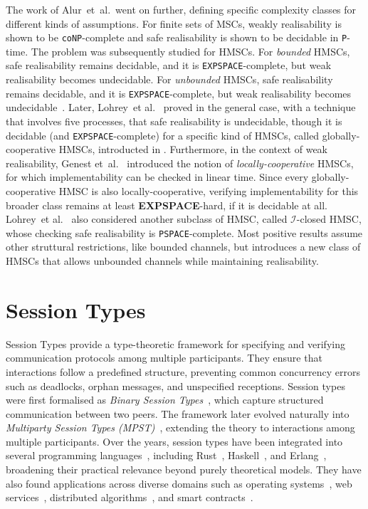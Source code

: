The work of Alur~et~al.~went on further, defining specific complexity classes 
for different kinds of assumptions. For finite sets of MSCs,
weakly realisability is shown to be \verb|coNP|-complete and safe 
realisability is shown to be decidable in \verb|P|-time. The problem
was subsequently studied for HMSCs. For \emph{bounded} HMSCs, safe realisability 
remains decidable, and it is \verb|EXPSPACE|-complete, but weak realisability 
becomes undecidable. For \emph{unbounded} HMSCs, 
safe realisability remains decidable, and it is \verb|EXPSPACE|-complete, but weak realisability 
becomes undecidable~\cite{alur2005realizability}. 
Later, Lohrey~et al.~\cite{lohrey2003realizability} proved in the general case, 
with a technique that involves five processes, that safe realisability 
is undecidable, though it is decidable (and \verb|EXPSPACE|-complete) 
for a specific kind of HMSCs, called globally-cooperative HMSCs, introducted 
in \cite{morin2002recognizable}.
Furthermore, in the context of weak realisability,
Genest et~al.~\cite{genest2006infinite} introduced the notion of
\emph{locally-cooperative} HMSCs, for which implementability can be
checked in linear time.
Since every globally-cooperative HMSC is also locally-cooperative,
verifying implementability for this broader class remains at least
\textbf{EXPSPACE}-hard, if it is decidable at all.
Lohrey~et al.~\cite{lohrey2003realizability} also considered another subclass of HMSC,
called $\mathcal{I}$-closed HMSC, whose checking safe realisability is \verb|PSPACE|-complete.
Most positive results assume other struttural restrictions, like bounded channels, 
but \cite{bollig2025high} introduces 
a new class of HMSCs that allows unbounded channels while maintaining realisability.

\section{Session Types}
Session Types provide a type-theoretic framework for specifying and verifying 
communication protocols among multiple participants.  
They ensure that interactions follow a predefined structure, 
preventing common concurrency errors such as deadlocks, orphan messages, 
and unspecified receptions. 
Session types were first formalised as 
\emph{Binary Session Types}~\cite{honda1993types}, 
which capture structured communication between two peers.  
The framework later evolved naturally into 
\emph{Multiparty Session Types (MPST)}~\cite{honda2008multiparty}, 
extending the theory to interactions among multiple participants.  
Over the years, session types have been integrated into several programming 
languages~\cite{ancona2016behavioral}, including 
Rust~\cite{jespersen2015session,chen2020ferrite}, 
Haskell~\cite{lindley2016embedding}, and 
Erlang~\cite{mostrous2011session}, 
broadening their practical relevance beyond purely theoretical models.  
They have also found applications across diverse domains such as 
operating systems~\cite{fahndrich2006language}, 
web services~\cite{yoshida2013scribble}, 
distributed algorithms~\cite{kouzapas2024session}, 
and smart contracts~\cite{das2021resource}.  

